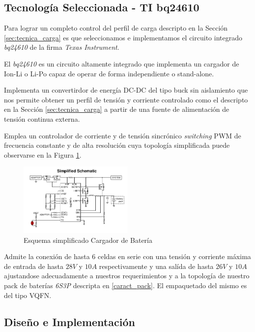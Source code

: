 \documentclass[10pt, a4paper]{report}
\begin{document}
\subsection{Tecnología Seleccionada - TI bq24610}

Para lograr un completo control del perfil de carga descripto en la Sección
\ref{sec:tecnica_carga}  es que seleccionamos e implementamos el circuito
integrado \emph{bq24610} de la firma \emph{Texas Instrument}.

El \emph{bq24610} es un circuito altamente integrado que implementa un cargador
de \acrfull{Ion-Li} o \acrfull{Li-Po} capaz de operar de forma independiente o
stand-alone.

Implementa un convertirdor de energía DC-DC del tipo buck sin aislamiento que
nos permite obtener un perfil de tensión y corriente controlado como el
descripto en la Sección \ref{sec:tecnica_carga} a partir de una fuente de
alimentación de tensión continua externa.

Emplea un controlador de corriente y de tensión sincrónico
\emph{switching} \acrshort{PWM} de frecuencia constante y de alta resolución cuya
topología simplificada puede observarse en la Figura \ref{fig:simp_sch_char}. 

\begin{figure}[h!]
    \centering
    \includegraphics[width=0.5\textwidth]{bat_char/simp_sch_char.png}
    \caption{Esquema simplificado Cargador de Batería}
    \label{fig:simp_sch_char}
\end{figure}
\FloatBarrier

Admite la conexión de hasta 6 celdas en serie con una tensión y
corriente máxima de entrada de hasta $28V$ y $10A$ respectivamente y una salída
de hasta $26V$ y $10A$ ajustandose adecuadamente a nuestros requerimientos y a
la topología de nuestro pack de baterías \emph{6S3P} descripta en
\ref{caract_pack}. El empaquetado del mismo es del tipo VQFN.

\subsection{Diseño e Implementación}
\end{document}
